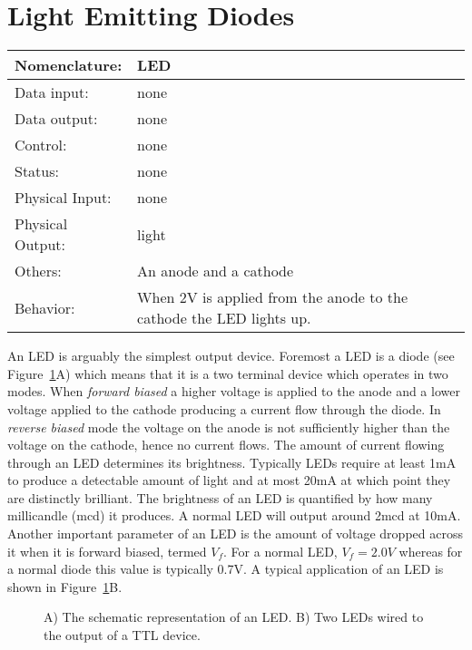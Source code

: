 \section{Light Emitting Diodes}
\label{page:led}
\begin{tabular}{|l|p{3.5in}|} \hline
Nomenclature: & LED \\ \hline
Data input:    & none     \\ \hline
Data output:   & none    \\ \hline
Control:       & none        \\ \hline
Status:        & none                                   \\ \hline
Physical Input:& none		\\ \hline
Physical Output:& light		\\ \hline
Others:        & An anode and a cathode                 \\ \hline
Behavior:      & When 2V is applied from the anode to the cathode the LED lights up. \\ \hline
\end{tabular}

An LED is arguably the simplest output device.  Foremost a LED
is a diode (see Figure~\ref{fig:commonPeripheralComponentsled}A) which means that it is a 
two terminal device which operates
in two modes.  When \textit{ forward biased} a higher voltage is applied
to the anode and a lower voltage applied to the cathode producing a 
current flow through the diode.  In \textit{ reverse biased} mode the voltage
on the anode is not sufficiently higher than the voltage on the cathode,
hence no current flows.   The amount of current flowing through an LED
determines its brightness.
Typically LEDs require at least 1mA to produce a detectable
amount of light and at most 20mA at which point they are 
distinctly brilliant.  The brightness of an LED is 
quantified by how many millicandle (mcd) it produces.  A normal LED will
output around 2mcd at 10mA.  Another important parameter of an LED is the 
amount of voltage dropped across it when it is forward biased, termed $V_f$.
For a normal LED, $V_f=2.0V$ whereas for a normal diode this value is 
typically 0.7V.  A typical application of an LED is shown in 
Figure~\ref{fig:commonPeripheralComponentsled}B.

\begin{figure}[ht]
\caption{A) The schematic representation of an LED.  B) Two LEDs wired
to the output of a TTL device.}
\label{fig:commonPeripheralComponentsled}
\end{figure}

